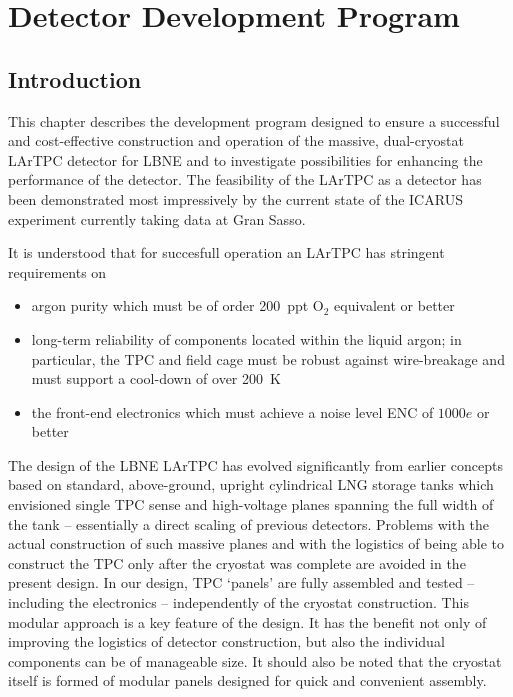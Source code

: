 %
%
\chapter{Detector Development Program}
\label{ch:randd}


\section{Introduction}
This chapter describes the development program designed to ensure a successful and cost-effective construction and operation of the massive, dual-cryostat LArTPC detector for LBNE and to investigate possibilities for enhancing the performance of the detector. The feasibility of the LArTPC as a detector has been demonstrated most impressively by the current state of the ICARUS experiment currently taking data at Gran Sasso.

It is understood that for succesfull operation an LArTPC has stringent requirements on
\begin{itemize}
 \item argon purity which must be of order 200~ppt O$_2$ equivalent or better
 \item long-term reliability of components located within the liquid argon; in particular, the TPC and field cage must be robust against wire-breakage and must support a cool-down of over 200~K
 \item the front-end electronics which must achieve a noise level ENC of $1000 e$ or better
\end{itemize}

The design of the LBNE LArTPC has evolved significantly from earlier concepts based on standard, above-ground, upright cylindrical LNG storage tanks which envisioned single TPC sense and high-voltage planes spanning the full width of the tank -- essentially a direct scaling of previous detectors. Problems with the actual construction of such massive planes and with the logistics of being able to construct the TPC only after the cryostat was complete are avoided in the present design. In our design,  TPC `panels'  are fully assembled and tested  -- including the electronics --  independently of the cryostat construction. This modular approach is a key feature of the design. It has the benefit not only of improving the logistics of detector construction, but also the individual components can be of manageable size. It should also be noted that the cryostat itself is formed of modular panels designed for quick and convenient assembly.

